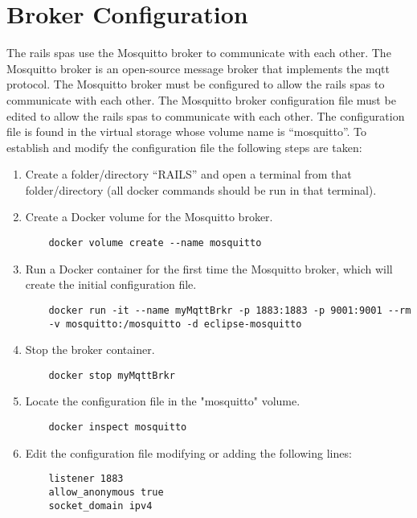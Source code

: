 \section{Broker Configuration}
\label{sec:brokerconfig}
The \gls{rails} \glspl{spa} use the Mosquitto broker to communicate with each other. The Mosquitto broker is an open-source message broker that implements the \gls{mqtt} protocol. The Mosquitto broker must be configured to allow the \gls{rails} \glspl{spa} to communicate with each other. The Mosquitto broker configuration file must be edited to allow the \gls{rails} \glspl{spa} to communicate with each other. The configuration file is found in the virtual storage whose volume name is “mosquitto”. To establish and modify the configuration file the following steps are taken:
\begin{enumerate}
    \item Create a folder/directory ``RAILS'' and open a terminal from that folder/directory (all docker commands should be run in that terminal).
    \item Create a Docker volume for the Mosquitto broker.
    \begin{verbatim}
    docker volume create --name mosquitto
    \end{verbatim}
    \item Run a Docker container for the first time the Mosquitto broker, which will create the initial configuration file.
    \begin{verbatim}
    docker run -it --name myMqttBrkr -p 1883:1883 -p 9001:9001 --rm
    -v mosquitto:/mosquitto -d eclipse-mosquitto
    \end{verbatim}
    \item Stop the broker container.
    \begin{verbatim}    
    docker stop myMqttBrkr
    \end{verbatim}
    \item Locate the configuration file in the "mosquitto" volume.
    \begin{verbatim}    
    docker inspect mosquitto
    \end{verbatim}
    \item Edit the configuration file modifying or adding the following lines:
    \begin{verbatim}
    listener 1883
    allow_anonymous true
    socket_domain ipv4
    \end{verbatim}
\end{enumerate}
